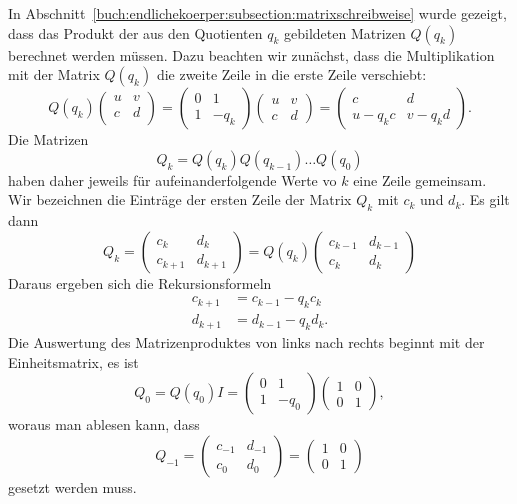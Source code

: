 In Abschnitt~\ref{buch:endlichekoerper:subsection:matrixschreibweise}
wurde gezeigt, dass das Produkt der aus den Quotienten $q_k$ gebildeten
Matrizen $Q(q_k)$ berechnet werden müssen.
Dazu beachten wir zunächst, dass die Multiplikation mit der Matrix
$Q(q_k)$ die zweite Zeile in die erste Zeile verschiebt:
\[
Q(q_k)
\begin{pmatrix}
u&v\\
c&d\\
\end{pmatrix}
=
\begin{pmatrix}0&1\\1&-q_k\end{pmatrix}
\begin{pmatrix}
u&v\\
c&d
\end{pmatrix}
=
\begin{pmatrix}
c&d\\
u-q_kc&v-q_kd
\end{pmatrix}.
\]
Die Matrizen
\[
Q_k = Q(q_k)Q(q_{k-1})\dots Q(q_0)
\]
haben daher jeweils für aufeinanderfolgende Werte vo $k$ eine Zeile
gemeinsam.
Wir bezeichnen die Einträge der ersten Zeile der Matrix $Q_k$ mit
$c_k$ und $d_k$.
Es gilt dann
\[
Q_k
=
\begin{pmatrix}
c_{k}  &d_{k}  \\
c_{k+1}&d_{k+1}
\end{pmatrix}
=
Q(q_k)
\begin{pmatrix}
c_{k-1}&d_{k-1}\\
c_{k}  &d_{k}
\end{pmatrix}
\]
Daraus ergeben sich die Rekursionsformeln
\begin{equation}
\begin{aligned}
c_{k+1}&=c_{k-1}-q_kc_k\\
d_{k+1}&=d_{k-1}-q_kd_k.
\end{aligned}
\label{buch:endlichekoerper:eqn:cdrekursion}
\end{equation}
Die Auswertung des Matrizenproduktes von links nach rechts beginnt mit
der Einheitsmatrix, es ist
\[
Q_0
=
Q(q_0) I
=
\begin{pmatrix}
0&1\\
1&-q_0
\end{pmatrix}
\begin{pmatrix}
1&0\\0&1\end{pmatrix},
\]
woraus man ablesen kann, dass
\begin{equation}
Q_{-1}
=
\begin{pmatrix}
c_{-1}&d_{-1}\\
c_0&d_0
\end{pmatrix}
=
\begin{pmatrix}
1&0\\
0&1
\end{pmatrix}
\label{buch:endlichekoerper:eqn:cdinitial}
\end{equation}
gesetzt werden muss.


